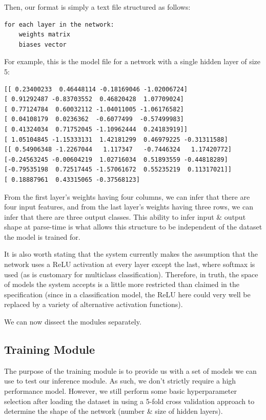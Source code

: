 \documentclass[12pt, titlepage]{article}
\begin{document}
Then, our format is simply a text file structured as follows:
\begin{verbatim}
for each layer in the network:
    weights matrix
    biases vector
\end{verbatim}
For example, this is the model file for a network with a single hidden layer of size 5:
\begin{verbatim}
[[ 0.23400233  0.46448114 -0.18169046 -1.02006724]
[ 0.91292487 -0.83703552  0.46820428  1.07709024]
[ 0.77124784  0.60032112 -1.04011005 -1.06176582]
[ 0.04108179  0.0236362  -0.6077499  -0.57499983]
[ 0.41324034  0.71752045 -1.10962444  0.24183919]]
[ 1.05104845 -1.15333131  1.42181299  0.46979225 -0.31311588]
[[ 0.54906348 -1.2267044   1.117347   -0.7446324   1.17420772]
[-0.24563245 -0.00604219  1.02716034  0.51893559 -0.44818289]
[-0.79535198  0.72517445 -1.57061672  0.55235219  0.11317021]]
[ 0.18887961  0.43315065 -0.37568123]   
\end{verbatim}
From the first layer's weights having four columns, we can infer that there are four input features, and from the last layer's weights having three rows, we can infer that there are three output classes. This ability to infer input \& output shape at parse-time is what allows this structure to be independent of the dataset the model is trained for.\bigskip

It is also worth stating that the system currently makes the assumption that the network uses a ReLU activation at every layer except the last, where softmax is used (as is customary for multiclass classification). Therefore, in truth, the space of models the system accepts is a little more restricted than claimed in the specification (since in a classification model, the ReLU here could very well be replaced by a variety of alternative activation functions).\bigskip

We can now dissect the modules separately.

\subsection{Training Module}
The purpose of the training module is to provide us with a set of models we can use to test our inference module. As such, we don't strictly require a high performance model. However, we still perform some basic hyperparameter selection after loading the dataset in using a 5-fold cross validation approach to determine the shape of the network (number \& size of hidden layers).\bigskip
\end{document}
